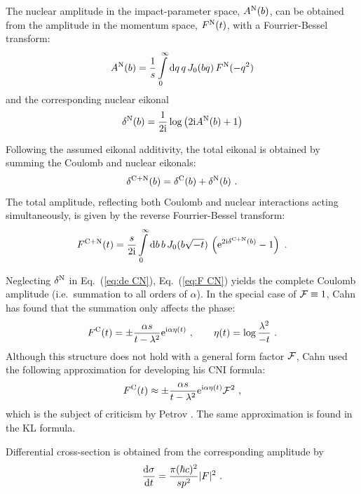 \documentclass[pdftex,twocolumn,epjc3]{svjour3}
\def\d{{\rm d}}
\def\e{{\rm e}}
\def\I{{\rm i}}
\begin{document}
The nuclear amplitude in the impact-parameter space, $A^{\rm N}(b)$, can be obtained from the amplitude in the momentum space, $F^{\rm N}(t)$, with a Fourrier-Bessel transform:
\begin{equation}
A^{\rm N}(b) = {1\over s} \int\limits_0^\infty \d q\, q\, J_0(bq)\, F^{\rm N}(-q^2)
\label{eq:A N}
\end{equation}
and the corresponding nuclear eikonal
\begin{equation}
\delta^{\rm N}(b) = {1\over 2\I} \log\left( 2\I A^{\rm N}(b) + 1\right)
\label{eq:de N}
\end{equation}

Following the assumed eikonal additivity, the total eikonal is obtained by summing the Coulomb and nuclear eikonals:
\begin{equation}
\delta^{\rm C+N}(b) = \delta^{\rm C}(b) + \delta^{\rm N}(b)\ .
\label{eq:de CN}
\end{equation}
The total amplitude, reflecting both Coulomb and nuclear interactions acting simultaneously, is given by the reverse Fourrier-Bessel transform:
\begin{equation}
F^{\rm C+N}(t) = {s\over 2\I} \int
\limits
_0^\infty 
\d b\, b\,J_0(b\sqrt{-t})\,\left( \e^{2\I \delta^{\rm C+N}(b)} - 1 \right)\ .
\label{eq:F CN}
\end{equation}

Neglecting $\delta^{\rm N}$ in Eq.~(\ref{eq:de CN}), Eq.~(\ref{eq:F CN}) yields the complete Coulomb amplitude (i.e.~summation to all orders of $\alpha$). In the special case of ${\cal F} \equiv 1$, Cahn has found that the summation only affects the phase:
\begin{equation}
F^{\rm C}(t) = \pm {\alpha s\over t - \lambda^2} \e^{\I\alpha \eta(t)}\ ,\qquad \eta(t) = \log {\lambda^2\over -t}\ .
\label{eq:F C comp}
\end{equation}
Although this structure does not hold with a general form factor ${\cal F}$, Cahn used the following approximation for developing his CNI formula:
\begin{equation}
F^{\rm C}(t) \approx \pm {\alpha s\over t - \lambda^2} \e^{\I\alpha \eta(t)} {\cal F}^2  \ ,
\label{eq:F C comp ff}
\end{equation}
which is the subject of criticism by Petrov \cite{petrov2018}. The same approximation is found in the KL formula.

Differential cross-section is obtained from the corresponding amplitude by
\begin{equation}
{\d\sigma\over\d t} = {\pi(\hbar c)^2\over s p^2} |F|^2\ .
\label{eq:cs}
\end{equation}
\end{document}
